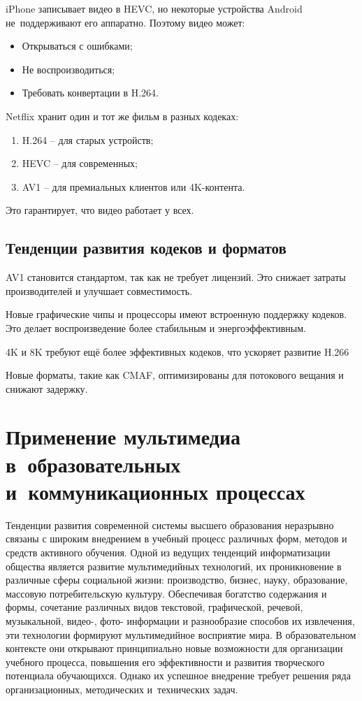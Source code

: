 \documentclass{ou}
\begin{document}
iPhone записывает видео в HEVC, но некоторые устройства Android не~поддерживают его аппаратно. Поэтому видео может:
\begin{itemize}[label=-, leftmargin=0em, itemindent=3.35em, nosep]
\item Открываться с ошибками;
\item Не воспроизводиться;
\item Требовать конвертации в H.264.
\end{itemize}

Netflix хранит один и тот же фильм в разных кодеках:
\begin{enumerate}[leftmargin=0em, itemindent=3.75em, nosep, label=\arabic*)]
\item H.264 -- для старых устройств;
\item HEVC -- для современных;
\item AV1 -- для премиальных клиентов или 4K-контента.
\end{enumerate}

Это гарантирует, что видео работает у всех.
\subsection{Тенденции развития кодеков и форматов}
AV1 становится стандартом, так как не требует лицензий. Это снижает затраты производителей и улучшает совместимость.

Новые графические чипы и процессоры имеют встроенную поддержку кодеков. Это делает воспроизведение более стабильным и энергоэффективным.

4K и 8K требуют ещё более эффективных кодеков, что ускоряет развитие H.266

Новые форматы, такие как CMAF, оптимизированы для потокового вещания и снижают задержку.
\newpage
\section{Применение мультимедиа в~образовательных и~коммуникационных процессах}
Тенденции развития современной системы высшего образования неразрывно связаны с широким внедрением в учебный процесс различных форм, методов и средств активного обучения. Одной из ведущих тенденций информатизации общества является развитие мультимедийных технологий, их проникновение в различные сферы социальной жизни: производство, бизнес, науку, образование, массовую потребительскую культуру. Обеспечивая богатство содержания и формы, сочетание различных видов текстовой, графической, речевой, музыкальной, видео-, фото- информации и разнообразие способов их извлечения, эти технологии формируют мультимедийное восприятие мира. В образовательном контексте они открывают принципиально новые возможности для организации учебного процесса, повышения его эффективности и развития творческого потенциала обучающихся. Однако их успешное внедрение требует решения ряда организационных, методических и~технических задач. 
\end{document}
